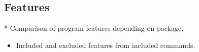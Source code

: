 \subsection{Features}\label{Features}

* Comparison of program features depending on package.

\begin{itemize}
    \item Included and excluded features from included commands.
\end{itemize}